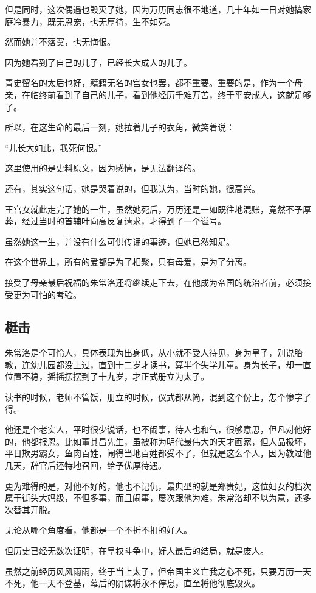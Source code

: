\begin{multicols}{\theparacolNo}
		但是同时，这次偶遇也毁灭了她，因为万历同志很不地道，几十年如一日对她搞家庭冷暴力，既无恩宠，也无厚待，生不如死。

		然而她并不落寞，也无悔恨。

		因为她看到了自己的儿子，已经长大成人的儿子。

		青史留名的太后也好，籍籍无名的宫女也罢，都不重要。重要的是，作为一个母亲，在临终前看到了自己的儿子，看到他经历千难万苦，终于平安成人，这就足够了。

		所以，在这生命的最后一刻，她拉着儿子的衣角，微笑着说：

		“儿长大如此，我死何恨。”

		这里使用的是史料原文，因为感情，是无法翻译的。

		还有，其实这句话，她是哭着说的，但我认为，当时的她，很高兴。

		王宫女就此走完了她的一生，虽然她死后，万历还是一如既往地混账，竟然不予厚葬，经过当时的首辅叶向高反复请求，才得到了一个谥号。

		虽然她这一生，并没有什么可供传诵的事迹，但她已然知足。

		在这个世界上，所有的爱都是为了相聚，只有母爱，是为了分离。

		接受了母亲最后祝福的朱常洛还将继续走下去，在他成为帝国的统治者前，必须接受更为可怕的考验。

		\subsection{梃击}
		朱常洛是个可怜人，具体表现为出身低，从小就不受人待见，身为皇子，别说胎教，连幼儿园都没上过，直到十二岁才读书，算半个失学儿童。身为长子，却一直位置不稳，摇摇摆摆到了十九岁，才正式册立为太子。

		读书的时候，老师不管饭，册立的时候，仪式都从简，混到这个份上，怎个惨字了得。

		他还是个老实人，平时很少说话，也不闹事，待人也和气，很够意思，但凡对他好的，他都报恩。比如董其昌先生，虽被称为明代最伟大的天才画家，但人品极坏，平日欺男霸女，鱼肉百姓，闹得当地百姓都受不了，但就是这么个人，因为教过他几天，辞官后还特地召回，给予优厚待遇。

		更为难得的是，对他不好的，他也不记仇，最典型的就是郑贵妃，这位妇女的档次属于街头大妈级，不但多事，而且闹事，屡次跟他为难，朱常洛却不以为意，还多次替其开脱。

		无论从哪个角度看，他都是一个不折不扣的好人。

		但历史已经无数次证明，在皇权斗争中，好人最后的结局，就是废人。

		虽然之前经历风风雨雨，终于当上太子，但帝国主义亡我之心不死，只要万历一天不死，他一天不登基，幕后的阴谋将永不停息，直至将他彻底毁灭。


\end{multicols}
